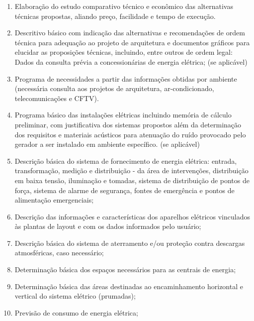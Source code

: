 \begin{enumerate}
\begin{enumerate}
			\item Elaboração do estudo comparativo técnico e econômico das alternativas técnicas propostas, aliando preço, facilidade e tempo de execução.
			
			\item Descritivo básico com indicação das alternativas e recomendações de ordem técnica para adequação ao projeto de arquitetura e documentos gráficos para elucidar as proposições técnicas, incluindo, entre outros de ordem legal: Dados da consulta prévia a concessionárias de energia elétrica; (se aplicável)
			
			\item Programa de necessidades a partir das informações obtidas por ambiente (necessária consulta aos projetos de arquitetura, ar-condicionado, telecomunicações e CFTV).
			
			\item Programa básico das instalações elétricas incluindo memória de cálculo preliminar, com justificativa dos sistemas propostos além da determinação dos requisitos e materiais acústicos para atenuação do ruído provocado pelo gerador a ser instalado em ambiente específico. (se aplicável)			
	
			\item Descrição básica do sistema de fornecimento de energia elétrica: entrada, transformação, medição e distribuição - da área de intervenções, distribuição em baixa tensão, iluminação e tomadas, sistema de distribuição de pontos de força, sistema de alarme de segurança, fontes de emergência e pontos de alimentação emergenciais; 
			
			\item Descrição das informações e características dos aparelhos elétricos vinculados às plantas de layout e com os dados informados pelo usuário; 
			
			\item Descrição básica do sistema de aterramento e/ou proteção contra descargas atmosféricas, caso necessário;
			
			\item Determinação básica dos espaços necessários para as centrais de energia;
			
			\item Determinação básica das áreas destinadas ao encaminhamento horizontal e vertical do sistema elétrico (prumadas);
			
			\item Previsão de consumo de energia elétrica;
			

\end{enumerate}
\end{enumerate}
